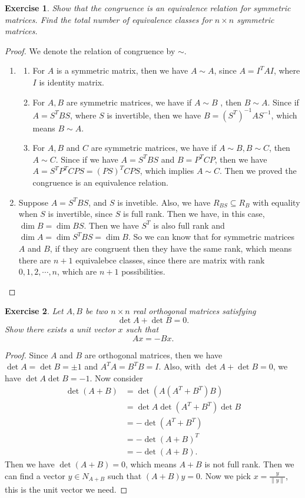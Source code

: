 \documentclass[11pt]{book}
\newtheorem{exercise}{Exercise}[section]
\theoremstyle{definition}
\numberwithin{equation}{chapter}
\begin{document}
\medskip

\begin{exercise}
Show that the congruence is an equivalence relation for symmetric
matrices. Find the total number of equivalence classes for $n\times n$
symmetric matrices.
\end{exercise}
\begin{proof}
We denote the relation of congruence by $\sim$.
\begin{enumerate}[label=(\alph*)]
    \item \begin{enumerate}[label=\arabic*)]
        \item For $A$ is a symmetric matrix, then we have $A\sim A$, since $A = I^TAI$, where $I$ is identity matrix.
        \item For $A,B$ are symmetric matrices, we have if $A\sim B$ , then $B\sim A$. Since if $A = S^TBS$, where $S$ is invertible, then we have $B = (S^T)^{-1}AS^{-1}$, which means $B\sim A$.
        \item For $A,B$ and $C$ are symmetric matrices, we have if $A\sim B,B\sim C$, then $A\sim C$. Since if we have $A = S^TBS$ and $B = P^TCP$, then we have $A = S^TP^TCPS = (PS)^TCPS$, which implies $A\sim C$. Then we proved the congruence is an equivalence relation.
    \end{enumerate}
    \item Suppose $A = S^TBS$, and $S$ is invetible. Also, we have $R_{BS}\subseteq R_{B}$ with equality when $S$ is invertible, since $S$ is full rank. Then we have, in this case, $\dim B = \dim BS$. Then we have $S^T$ is also full rank and $\dim A = \dim S^TBS = \dim B$. So we can know that for symmetric matrices $A$ and $B$, if they are congruent then they have the same rank, which means there are $n+1$ equivalebce classes, since there are matrix with rank $0,1,2,\cdots,n$, which are $n+1$ possibilities.
\end{enumerate}
\end{proof}

\medskip

\begin{exercise}
Let $A,B$ be two $n\times n$ real orthogonal matrices satisfying
$$\det A+\det B=0.$$
Show there exists a unit vector $x$ such that%
$$Ax=-Bx.$$
\end{exercise}
\begin{proof}
Since $A$ and $B$ are orthogonal matrices, then we have $\det A = \det B = \pm 1$ and $A^TA = B^TB = I$. Also, with $\det A+\det B=0$, we have $\det A\det B = -1$. Now consider 
\begin{align*}
    \det(A+B) & = \det(A(A^T+B^T)B) \\
    & = \det A \det(A^T+B^T) \det B \\
    & = - \det(A^T+B^T) \\
    & = - \det(A+B)^T  \\
    &= - \det(A+B).
\end{align*}
Then we have $\det(A+B) = 0$, which means $A+B$ is not full rank. Then we can find a vector $y\in N_{A+B}$ such that $(A+B)y = 0$. Now we pick $x = \frac{y}{\|y\|}$, this is the unit vector we need.
\end{proof}
\end{document}

